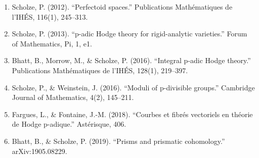 \begin{enumerate}
\item Scholze, P. (2012). ``Perfectoid spaces.'' Publications Mathématiques de l'IHÉS, 116(1), 245--313.
\item Scholze, P. (2013). ``p-adic Hodge theory for rigid-analytic varieties.'' Forum of Mathematics, Pi, 1, e1.
\item Bhatt, B., Morrow, M., \& Scholze, P. (2016). ``Integral p-adic Hodge theory.'' Publications Mathématiques de l'IHÉS, 128(1), 219--397.
\item Scholze, P., \& Weinstein, J. (2016). ``Moduli of p-divisible groups.'' Cambridge Journal of Mathematics, 4(2), 145--211.
\item Fargues, L., \& Fontaine, J.-M. (2018). ``Courbes et fibrés vectoriels en théorie de Hodge p-adique.'' Astérisque, 406.
\item Bhatt, B., \& Scholze, P. (2019). ``Prisms and prismatic cohomology.'' arXiv:1905.08229.
\end{enumerate}
